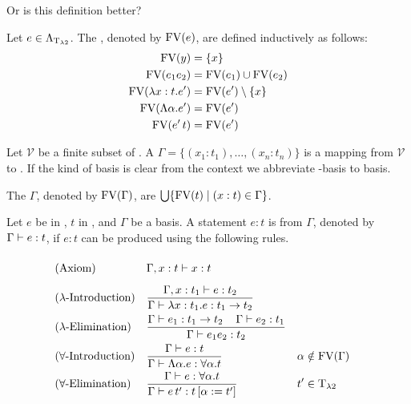 Or is this definition better?
\begin{definition}
	Let $e\in\Lambda_{\text{T}_{\lambda2}}$. The , denoted by $\text{FV}(e)$, are defined inductively as follows:
	\begin{align*}
		\text{FV}(y)                & =\{x\}                 \\
		\text{FV}(e_1e_2)           & =\text{FV}(e_1)\cup\text{FV}(e_2)  \\
		\text{FV}(\lambda x:t.e')   & =\text{FV}(e')\setminus\{x\} \\
		\text{FV}(\Lambda\alpha.e') & =\text{FV}(e')               \\
		\text{FV}(e'\,t)            & =\text{FV}(e')               \\
	\end{align*}
\end{definition}
\begin{definition} Let $\mathcal{V}$ be a finite subset of \lambdaTypVar{}.	A  $\Gamma=\{(x_1:t_1),\dots,(x_n:t_n)\}$ is a mapping from $\mathcal{V}$ to \lambdaTypes{}. If the kind of basis is clear from the context we abbreviate \lambdaTwo-basis to basis. 

The  $\Gamma$, denoted by $\text{FV}(\Gamma)$, are $\bigcup\{\text{FV}(t)\mid(x:t)\in\Gamma\}$.
\end{definition}


\begin{definition}
Let $e$ be in \lambdaTerms{}, $t$ in \lambdaTypes, and $\Gamma$ be a basis. A statement $e:t$ is  from $\Gamma$, denoted by $\Gamma\vdash e:t$, if $e:t$ can be produced using the following rules.
\begin{mdframed} 
	\begingroup
	\addtolength{\jot}{0.3cm}
	\begin{align*}
		&(\text{Axiom}) &&\Gamma,x:t\lambdaModels x:t\vphantom{\frac{t_1}{t_1}}\\
		&(\lambda\text{-Introduction}) &&\frac{\Gamma,x:t_1\lambdaModels e:t_2}{\Gamma\lambdaModels \lambda x:t_1.e:t_1\to t_2}\\
		&(\lambda\text{-Elimination}) &&\frac{\Gamma\lambdaModels e_1:t_1\to t_2 \hspace{0.4cm}\Gamma\lambdaModels e_2:t_1}{\Gamma\lambdaModels e_1e_2:t_2}\\
& (\forall\text{-Introduction}) &   & \frac{\Gamma\lambdaModels e:t}{\Gamma\lambdaModels \Lambda\alpha.e:\forall\alpha.t}                 &   & \alpha\notin\FV(\Gamma) \\
& (\forall\text{-Elimination})  &   & \frac{\Gamma\lambdaModels e:\forall\alpha.t }{\Gamma\lambdaModels e\,t':t\left[ \alpha:=t'\right] } &   & t'\in\lambdaTypes %
	\end{align*}
	\endgroup
\end{mdframed}
\end{definition}

